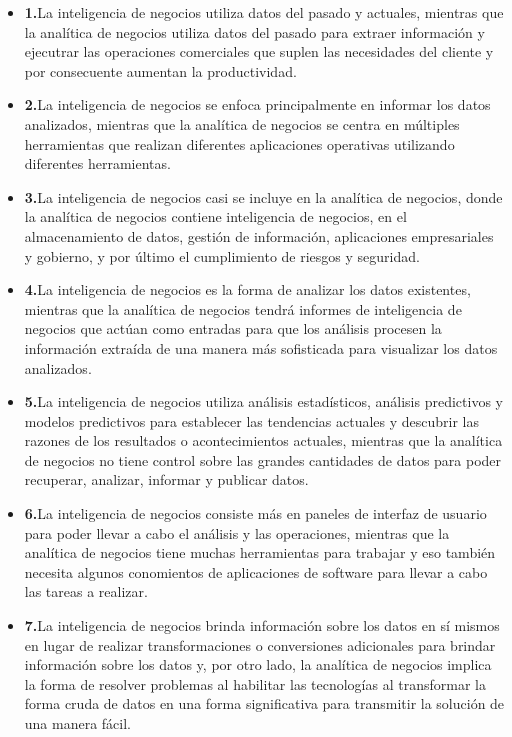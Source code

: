 \documentclass[preprint,12pt]{elsarticle}
\begin{document}
	\begin{itemize}

	\item{\textbf{1.}}La inteligencia de negocios utiliza datos del pasado y actuales, mientras que la analítica de 			negocios utiliza datos del pasado para extraer información y ejecutrar las operaciones comerciales que suplen las 		necesidades del cliente y por consecuente aumentan la productividad.
	\item{\textbf{2.}}La inteligencia de negocios se enfoca principalmente en informar los datos analizados, mientras 		que la analítica de negocios se centra en múltiples herramientas que realizan diferentes aplicaciones operativas 			utilizando diferentes herramientas.
	\item{\textbf{3.}}La inteligencia de negocios casi se incluye en la analítica de negocios, donde la analítica de 			negocios contiene inteligencia de negocios, en el almacenamiento de datos, gestión de información, aplicaciones 		empresariales y gobierno, y por último el cumplimiento de riesgos y seguridad.
	\item{\textbf{4.}}La inteligencia de negocios es la forma de analizar los datos existentes, mientras que la analítica 	de negocios tendrá informes de inteligencia de negocios que actúan como entradas para que los análisis procesen   	la información extraída de una manera más sofisticada para visualizar los datos analizados.
	\item{\textbf{5.}}La inteligencia de negocios utiliza análisis estadísticos, análisis predictivos y modelos predictivos 		para establecer las tendencias actuales y descubrir las razones de los resultados o acontecimientos actuales, 			mientras que la analítica de negocios no tiene control sobre las grandes cantidades de datos para poder 				recuperar, analizar, informar y publicar datos.
	\item{\textbf{6.}}La inteligencia de negocios consiste más en paneles de interfaz de usuario para poder llevar a 		cabo el análisis y las operaciones, mientras que la analítica de negocios tiene muchas herramientas para trabajar y 		eso también necesita algunos conomientos de aplicaciones de software para llevar a cabo las tareas a realizar.
	\item{\textbf{7.}}La inteligencia de negocios brinda información sobre los datos en sí mismos en lugar de realizar 		transformaciones o conversiones adicionales para brindar información sobre los datos y, por otro lado, la analítica 		de negocios implica la forma de resolver problemas al habilitar las tecnologías al transformar la forma cruda de 			datos en una forma significativa para transmitir la solución de una manera fácil.
	\end{itemize}
\end{document}
